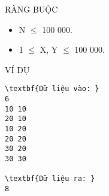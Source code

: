 RÀNG BUỘC
\begin{itemize}
	\item N  $\le$  100 000.
	\item 1  $\le$  X, Y  $\le$  100 000.
\end{itemize}
VÍ DỤ
\begin{verbatim}
\textbf{Dữ liệu vào: }
6
10 10
20 10
10 20
20 20
30 20
30 30

\textbf{Dữ liệu ra: }
8\end{verbatim}